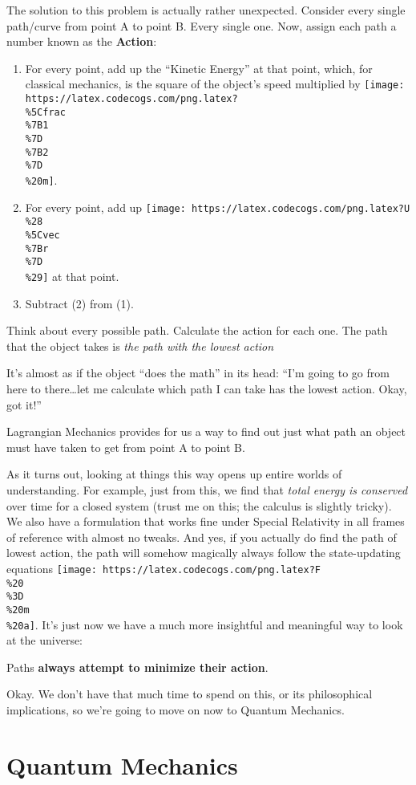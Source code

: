 \documentclass[]{article}
\begin{document}
The solution to this problem is actually rather unexpected. Consider every
single path/curve from point A to point B. Every single one. Now, assign each
path a number known as the \textbf{Action}:

\begin{enumerate}
\def\labelenumi{\arabic{enumi}.}
\tightlist
\item
  For every point, add up the ``Kinetic Energy'' at that point, which, for
  classical mechanics, is the square of the object's speed multiplied by
  \texttt{[image: https://latex.codecogs.com/png.latex?\\\%5Cfrac\\\%7B1\\\%7D\\\%7B2\\\%7D\\\%20m]}.
\item
  For every point, add up
  \texttt{[image: https://latex.codecogs.com/png.latex?U\\\%28\\\%5Cvec\\\%7Br\\\%7D\\\%29]}
  at that point.
\item
  Subtract (2) from (1).
\end{enumerate}

Think about every possible path. Calculate the action for each one. The path
that the object takes is \emph{the path with the lowest action}

It's almost as if the object ``does the math'' in its head: ``I'm going to go
from here to there\ldots let me calculate which path I can take has the lowest
action. Okay, got it!''

Lagrangian Mechanics provides for us a way to find out just what path an object
must have taken to get from point A to point B.

As it turns out, looking at things this way opens up entire worlds of
understanding. For example, just from this, we find that \emph{total energy is
conserved} over time for a closed system (trust me on this; the calculus is
slightly tricky). We also have a formulation that works fine under Special
Relativity in all frames of reference with almost no tweaks. And yes, if you
actually do find the path of lowest action, the path will somehow magically
always follow the state-updating equations
\texttt{[image: https://latex.codecogs.com/png.latex?F\\\%20\\\%3D\\\%20m\\\%20a]}. It's
just now we have a much more insightful and meaningful way to look at the
universe:

Paths \textbf{always attempt to minimize their action}.

Okay. We don't have that much time to spend on this, or its philosophical
implications, so we're going to move on now to Quantum Mechanics.

\hypertarget{quantum-mechanics}{%
\section{Quantum Mechanics}\label{quantum-mechanics}}
\end{document}
